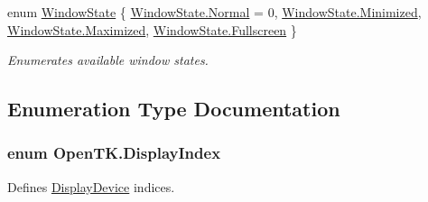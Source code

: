 \begin{DoxyCompactItemize}
enum \hyperlink{namespace_open_t_k_ace9268dc87bd36f48c9d9d8b939559b4}{Window\-State} \{ \hyperlink{namespace_open_t_k_ace9268dc87bd36f48c9d9d8b939559b4a960b44c579bc2f6818d2daaf9e4c16f0}{Window\-State.\-Normal} = 0, 
\hyperlink{namespace_open_t_k_ace9268dc87bd36f48c9d9d8b939559b4a074afcc50ae51f248cbae4950845549e}{Window\-State.\-Minimized}, 
\hyperlink{namespace_open_t_k_ace9268dc87bd36f48c9d9d8b939559b4a49d903a5c02560cf79bf6b516cc89457}{Window\-State.\-Maximized}, 
\hyperlink{namespace_open_t_k_ace9268dc87bd36f48c9d9d8b939559b4a0829ea6734059d66e6bf87096b215dc1}{Window\-State.\-Fullscreen}
 \}
\begin{DoxyCompactList}\small\item\em Enumerates available window states. \end{DoxyCompactList}\end{DoxyCompactItemize}


\subsection{Enumeration Type Documentation}
\hypertarget{namespace_open_t_k_a2869ea59bcff91cc6cc331f36c616389}{
\subsubsection[{Display\-Index}]{\setlength{\rightskip}{0pt plus 5cm}enum {\bf Open\-T\-K.\-Display\-Index}}}\label{namespace_open_t_k_a2869ea59bcff91cc6cc331f36c616389}


Defines \hyperlink{class_open_t_k_1_1_display_device}{Display\-Device} indices. 

